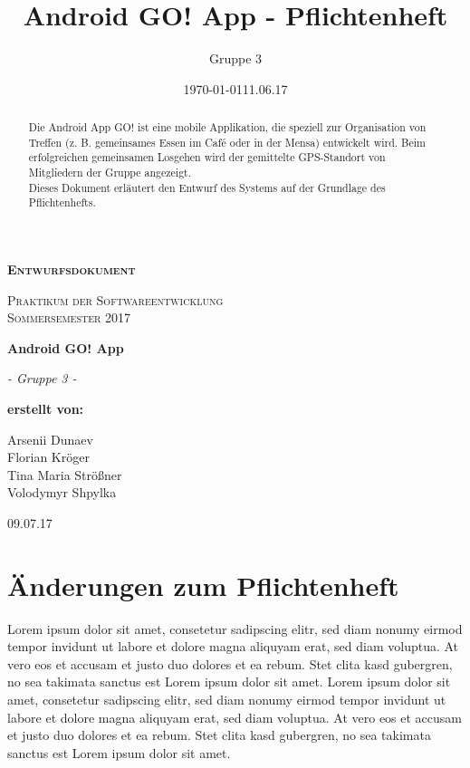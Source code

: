 \documentclass[11pt,a4paper]{report}
\date{\today}
\title{Android GO! App - Pflichtenheft}
\author{Gruppe 3}
\date{11.06.17}
\begin{document}
\begin{titlepage}
	\begin{center}
	{\scshape\LARGE \bfseries Entwurfsdokument \par}
	\vspace{1cm}
	{\scshape\Large Praktikum der Softwareentwicklung \\ Sommersemester 2017\par}
	\vspace{1.5cm}
	{\huge\bfseries Android GO! App\par}
	\vspace{2cm}
	{\Large\itshape - Gruppe 3 -\par}
	\vfill
	{\bfseries erstellt von:\par}
	Arsenii Dunaev \\
	Florian Kröger \\
	Tina Maria Strößner \\
	Volodymyr Shpylka \\	
	\vfill
	{\large 09.07.17 \par}	
	\end{center}
\end{titlepage}

\begin{abstract}
Die Android App GO! ist eine mobile Applikation, die speziell zur Organisation von Treffen (z. B. gemeinsames Essen im Café oder in der Mensa) entwickelt wird. Beim erfolgreichen gemeinsamen Losgehen wird der gemittelte GPS-Standort von Mitgliedern der Gruppe angezeigt.\\

Dieses Dokument erläutert den Entwurf des Systems auf der Grundlage des Pflichtenhefts.
\end{abstract}


\sloppy
{}
\tableofcontents



\chapter{Änderungen zum Pflichtenheft} {

Lorem ipsum dolor sit amet, consetetur sadipscing elitr, sed diam nonumy eirmod tempor invidunt ut labore et dolore magna aliquyam erat, sed diam voluptua. At vero eos et accusam et justo duo dolores et ea rebum. Stet clita kasd gubergren, no sea takimata sanctus est Lorem ipsum dolor sit amet. Lorem ipsum dolor sit amet, consetetur sadipscing elitr, sed diam nonumy eirmod tempor invidunt ut labore et dolore magna aliquyam erat, sed diam voluptua. At vero eos et accusam et justo duo dolores et ea rebum. Stet clita kasd gubergren, no sea takimata sanctus est Lorem ipsum dolor sit amet.
}
\end{document}
